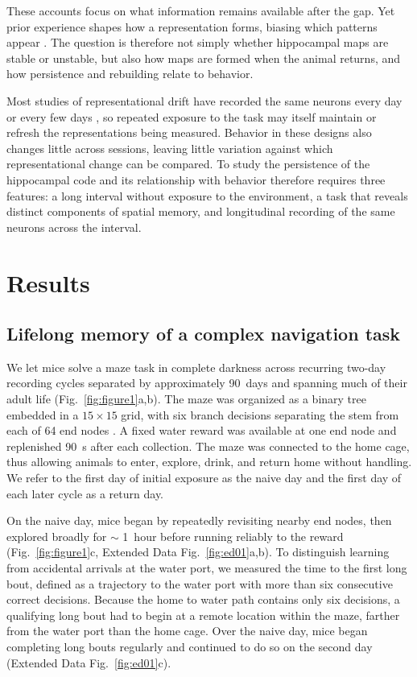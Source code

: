 \documentclass[fleqn,10pt]{wlscirep}
\begin{document}
These accounts focus on what information remains available after the gap. Yet prior experience shapes how a representation forms, biasing which patterns appear \cite{rowland_stable_2011,plitt_experience-dependent_2021,vaidya_formation_2025}. The question is therefore not simply whether hippocampal maps are stable or unstable, but also how maps are formed when the animal returns, and how persistence and rebuilding relate to behavior.

Most studies of representational drift have recorded the same neurons every day or every few days \cite{hainmueller_parallel_2018, gonzalez_persistence_2019, lee_statistical_2020, geva_time_2023, climer_hippocampal_2025}, so repeated exposure to the task may itself maintain or refresh the representations being measured. Behavior in these designs also changes little across sessions, leaving little variation against which representational change can be compared. To study the persistence of the hippocampal code and its relationship with behavior therefore requires three features: a long interval without exposure to the environment, a task that reveals distinct components of spatial memory, and longitudinal recording of the same neurons across the interval.

\section*{Results}

\subsection*{Lifelong memory of a complex navigation task}
We let mice solve a maze task in complete darkness across recurring two-day recording cycles separated by approximately 90~days and spanning much of their adult life (Fig.~\ref{fig:figure1}a,b). The maze was organized as a binary tree embedded in a $15 \times 15$ grid, with six branch decisions separating the stem from each of 64 end nodes \cite{rosenberg_mice_2021}. A fixed water reward was available at one end node and replenished 90~s after each collection. The maze was connected to the home cage, thus allowing animals to enter, explore, drink, and return home without handling. We refer to the first day of initial exposure as the naive day and the first day of each later cycle as a return day. 

On the naive day, mice began by repeatedly revisiting nearby end nodes, then explored broadly for $\sim$ 1~hour before running reliably to the reward (Fig.~\ref{fig:figure1}c, Extended Data Fig.~\ref{fig:ed01}a,b). To distinguish learning from accidental arrivals at the water port, we measured the time to the first long bout, defined as a trajectory to the water port with more than six consecutive correct decisions. Because the home to water path contains only six decisions, a qualifying long bout had to begin at a remote location within the maze, farther from the water port than the home cage. Over the naive day, mice began completing long bouts regularly and continued to do so on the second day (Extended Data Fig.~\ref{fig:ed01}c).
\end{document}
